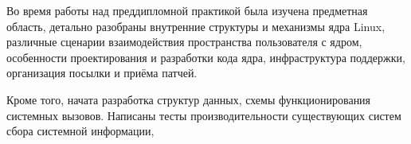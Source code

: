 \label{sec:outro}

Во время работы над преддипломной практикой была изучена предметная область,
детально разобраны внутренние структуры и механизмы ядра Linux, различные
сценарии взаимодействия пространства пользователя с ядром, особенности
проектирования и разработки кода ядра, инфраструктура поддержки, организация
посылки и приёма патчей.

Кроме того, начата разработка структур данных, схемы функционирования системных
вызовов. Написаны тесты производительности существующих систем сбора системной
информации, 